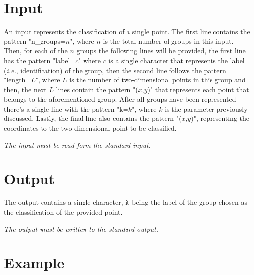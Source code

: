 \documentclass{article}
\begin{document}
\section*{Input}

An input represents the classification of a single point. The first line contains the pattern "n\_groups=$n$", where $n$ is the total number of groups in this input. Then, for each of the $n$ groups the following lines will be provided, the first line has the pattern "label=$c$" where $c$ is a single character that represents the label (\textit{i.e.}, identification) of the group, then the second line follows the pattern "length=$L$", where $L$ is the number of two-dimensional points in this group and then, the next $L$ lines contain the pattern "($x$,$y$)" that represents each point that belongs to the aforementioned group. After all groups have been represented there's a single line with the pattern "k=$k$", where $k$ is the parameter previously discussed. Lastly, the final line also contains the pattern "($x$,$y$)", representing the coordinates to the two-dimensional point to be classified.

\textit{The input must be read form the standard input.}

\section*{Output}

The output contains a single character, it being the label of the group chosen as the classification of the provided point.

\textit{The output must be written to the standard output.}

\section*{Example}
\end{document}
